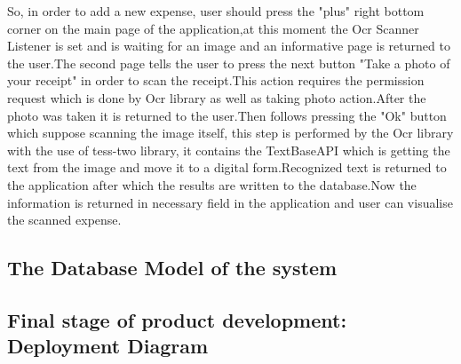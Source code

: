 So, in order to add a new expense, user should press the "plus" right bottom corner on the main page of the application,at this moment the Ocr Scanner Listener is set and is waiting for an image and an informative page is returned to the user.The second page tells the user to press the next button "Take a photo of your receipt" in order to scan the receipt.This action requires the permission request which is done by Ocr library as well as taking photo action.After the photo was taken it is returned to the user.Then follows pressing the "Ok" button which suppose scanning the image itself, this step is performed by the Ocr library with the use of tess-two library, it contains the TextBaseAPI which is getting the text from the image and move it to a digital form.Recognized text is returned to the application after which the results are written to the database.Now the information is returned in necessary field in the application and user can visualise the scanned expense.
\subsection{The Database Model of the system}
\subsection{Final stage of product development: Deployment Diagram}
